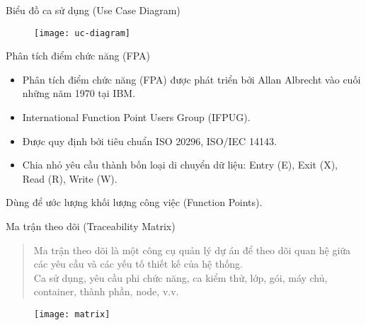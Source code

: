 \documentclass{beamer}
\begin{document}
\begin{frame}{Biểu đồ ca sử dụng (Use Case Diagram)}
    \begin{figure}
        \centering
        \texttt{[image: uc-diagram]}
    \end{figure}
\end{frame}


\begin{frame}{Phân tích điểm chức năng (FPA)}
    \begin{block}{}
        \begin{itemize}
            \item Phân tích điểm chức năng (FPA) được phát triển
            bởi Allan Albrecht vào cuối những năm 1970 tại IBM.
            \item International Function Point Users Group (IFPUG).
            \item Được quy định bởi tiêu chuẩn ISO 20296, ISO/IEC 14143.
            \item Chia nhỏ yêu cầu thành bốn loại di chuyển dữ liệu: Entry (E), Exit (X), Read (R), Write (W).
        \end{itemize}
    \end{block}
    \Large Dùng để ước lượng khối lượng công việc (Function Points).
\end{frame}


\begin{frame}{Ma trận theo dõi (Traceability Matrix)}
    \begin{block}{}
        \begin{quote}
            Ma trận theo dõi là một công cụ quản lý dự án
            để theo dõi quan hệ giữa các yêu cầu và các yếu tố
            thiết kế của hệ thống.\\
            \small Ca sử dụng, yêu cầu phi chức năng, ca kiểm thử, lớp, gói, máy chủ, container, thành phần, node, v.v.
        \end{quote}
    \end{block}
    \begin{figure}
        \centering
        \texttt{[image: matrix]}
    \end{figure}
\end{frame}
\end{document}
